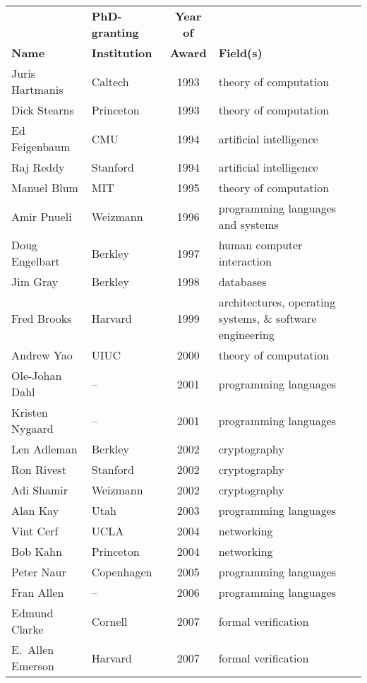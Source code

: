 \documentclass[doublespacing]{utdthesis}
\begin{document}
\begin{table}[p]
  \contcaption
  \begin{center}
  \begin{tabular}{llcp{2.5in}} \hline
  & \textbf{PhD-granting} & \textbf{Year of} & \\
  \textbf{Name} & \textbf{Institution} & \textbf{Award} & \textbf{Field(s)} \\ \hline
  Juris Hartmanis & Caltech & 1993 & theory of computation \\
  Dick Stearns & Princeton & 1993 & theory of computation \\
  Ed Feigenbaum & CMU & 1994 & artificial intelligence \\
  Raj Reddy & Stanford & 1994 & artificial intelligence \\
  Manuel Blum & MIT & 1995 & theory of computation \\
  Amir Pnueli & Weizmann & 1996 & programming languages and systems \\
  Doug Engelbart & Berkley & 1997 & human computer interaction \\
  Jim Gray & Berkley & 1998 & databases \\
  Fred Brooks & Harvard & 1999 & architectures, operating systems,
    \& software engineering \\
  Andrew Yao & UIUC & 2000 & theory of computation \\
  Ole-Johan Dahl & -- & 2001 & programming languages \\
  Kristen Nygaard & -- & 2001 & programming languages \\
  Len Adleman & Berkley & 2002 & cryptography \\
  Ron Rivest & Stanford & 2002 & cryptography \\
  Adi Shamir & Weizmann & 2002 & cryptography \\
  Alan Kay & Utah & 2003 & programming languages \\
  Vint Cerf & UCLA & 2004 & networking \\
  Bob Kahn & Princeton & 2004 & networking \\
  Peter Naur & Copenhagen & 2005 & programming languages \\
  Fran Allen & -- & 2006 & programming languages \\
  Edmund Clarke & Cornell & 2007 & formal verification \\
  E.~Allen Emerson & Harvard & 2007 & formal verification \\

\end{tabular}
\end{center}
\end{table}
\end{document}
